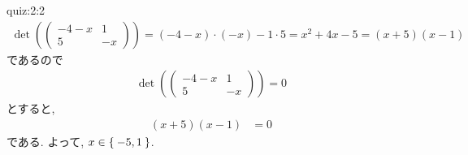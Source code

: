 \begin{answerof}{quiz:2:2}
  \begin{align*}
    \det(
    \begin{pmatrix}
      -4-x&1\\5&-x
    \end{pmatrix})=
    (-4-x)\cdot (-x) -1\cdot 5=x^2+4x-5=(x+5)(x-1)
  \end{align*}
  であるので
  \begin{align*}
    \det(\begin{pmatrix}
      -4-x&1\\5&-x
    \end{pmatrix})=0
  \end{align*}
  とすると,
  \begin{align*}
    (x+5)(x-1)&=0
  \end{align*}
  である.
  よって, $x\in \Set{-5,1}$.
\end{answerof}
